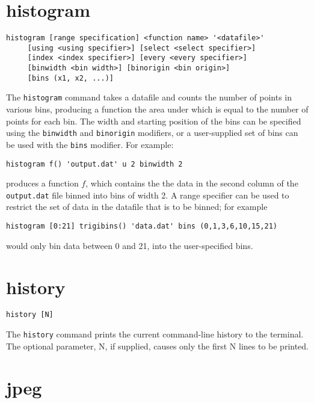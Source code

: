 \section{histogram}

\begin{verbatim}
histogram [range specification] <function name> '<datafile>' 
     [using <using specifier>] [select <select specifier>]
     [index <index specifier>] [every <every specifier>]
     [binwidth <bin width>] [binorigin <bin origin>]
     [bins (x1, x2, ...)]
\end{verbatim}

The {\tt histogram} command takes a datafile and counts the number of points in
various bins, producing a function the area under which is equal to the number
of points for each bin.  The width and starting position of the bins can be
specified using the {\tt binwidth} and {\tt binorigin} modifiers, or a
user-supplied set of bins can be used with the {\tt bins} modifier.  For
example:

\begin{verbatim}
histogram f() 'output.dat' u 2 binwidth 2
\end{verbatim}

\noindent produces a function $f$, which contains the the data in the second
column of the {\tt output.dat} file binned into bins of width 2.  A range
specifier can be used to restrict the set of data in the datafile that is to be
binned; for example

\begin{verbatim}
histogram [0:21] trigibins() 'data.dat' bins (0,1,3,6,10,15,21)
\end{verbatim}

\noindent would only bin data between 0 and 21, into the user-specified bins.

\section{history}

\begin{verbatim}
history [N]
\end{verbatim}

The {\tt history} command prints the current command-line history to the
terminal.  The optional parameter, N, if supplied, causes only the first N lines
to be printed.

\section{jpeg}

